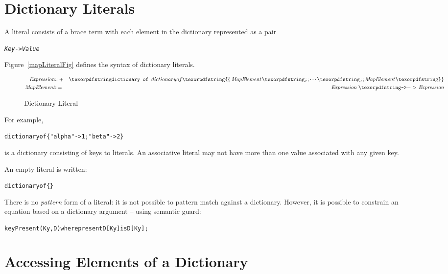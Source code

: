 \section{Dictionary Literals}
\label{mapLiteral}
A  literal consists of a  brace term with each element in the dictionary represented as a pair 
\begin{alltt}
\emph{Key} -> \emph{Value}
\end{alltt}
Figure~\vref{mapLiteralFig} defines the syntax of dictionary literals.
\begin{figure}[htbp]
\begin{eqnarray*}
\emph{Expression}&\arrowplus&\q{dictionary of }\q{\{}\,\emph{MapElement}\sequence{;}\emph{MapElement}\,\q{\}}\\
\emph{MapElement}&\arrow&\emph{Expression}\ \q{->}\ \emph{Expression}
\end{eqnarray*}
\caption{Dictionary Literal}
\label{mapLiteralFig}
\end{figure}
For example,
\begin{alltt}
dictionary of \{"alpha" -> 1; "beta"->2\}
\end{alltt}
is a dictionary consisting of  keys to  literals.
An associative  literal may not have more than one value associated with any given key.

An empty  literal is written:
\begin{alltt}
dictionary of \{\}
\end{alltt}

\begin{aside}
There is no \emph{pattern} form of a  literal: it is not possible to pattern match against a dictionary. However, it is possible to constrain an equation based on a dictionary argument -- using semantic guard:
\begin{alltt}
keyPresent(Ky,D) where present D[Ky] is D[Ky];
\end{alltt}
\end{aside}


\section{Accessing Elements of a Dictionary}
\label{associativeMapAccess}

